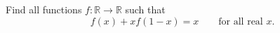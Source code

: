 Find all functions $f:\mathbb{R}\to\mathbb{R}$ such that
\[f(x)+xf(1-x)=x\qquad\text{for all real }x.\]
